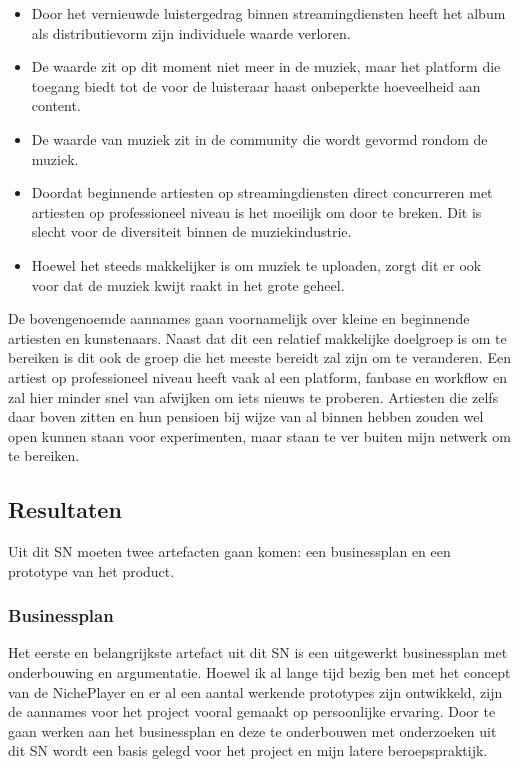 \begin{itemize}
    \item Door het vernieuwde luistergedrag binnen streamingdiensten heeft het album als distributievorm zijn individuele waarde verloren.
    \item De waarde zit op dit moment niet meer in de muziek, maar het platform die toegang biedt tot de voor de luisteraar haast onbeperkte hoeveelheid aan content.
    \item De waarde van muziek zit in de community die wordt gevormd rondom de muziek.
    \item Doordat beginnende artiesten op streamingdiensten direct concurreren met artiesten op professioneel niveau is het moeilijk om door te breken. Dit is slecht voor de diversiteit binnen de muziekindustrie.
    \item Hoewel het steeds makkelijker is om muziek te uploaden, zorgt dit er ook voor dat de muziek kwijt raakt in het grote geheel.
\end{itemize}

De bovengenoemde aannames gaan voornamelijk over kleine en beginnende artiesten en kunstenaars. Naast dat dit een relatief makkelijke doelgroep is om te bereiken is dit ook de groep die het meeste bereidt zal zijn om te veranderen. Een artiest op professioneel niveau heeft vaak al een platform, fanbase en workflow en zal hier minder snel van afwijken om iets nieuws te proberen. Artiesten die zelfs daar boven zitten en hun pensioen bij wijze van al binnen hebben zouden wel open kunnen staan voor experimenten, maar staan te ver buiten mijn netwerk om te bereiken.

\subsection{Resultaten}
Uit dit SN moeten twee artefacten gaan komen: een businessplan en een prototype van het product.

\subsubsection*{Businessplan}
Het eerste en belangrijkste artefact uit dit SN is een uitgewerkt businessplan met onderbouwing en argumentatie. Hoewel ik al lange tijd bezig ben met het concept van de NichePlayer en er al een aantal werkende prototypes zijn ontwikkeld, zijn de aannames voor het project vooral gemaakt op persoonlijke ervaring. Door te gaan werken aan het businessplan en deze te onderbouwen met onderzoeken uit dit SN wordt een basis gelegd voor het project en mijn latere beroepspraktijk.

